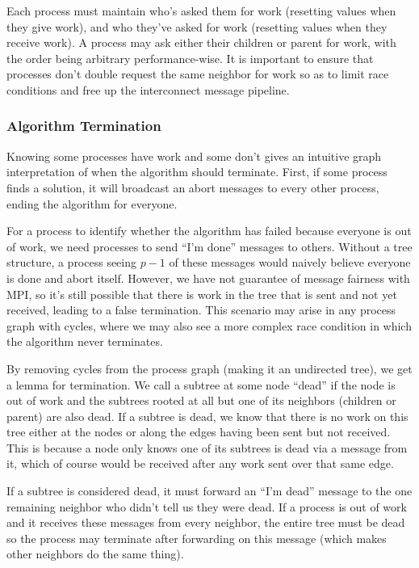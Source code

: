 \documentclass{article}
\begin{document}
Each process must maintain who's asked them for work (resetting values when they give work), and who they've asked for work (resetting values when they receive work). A process may ask either their children or parent for work, with the order being arbitrary performance-wise. It is important to ensure that processes don't double request the same neighbor for work so as to limit race conditions and free up the interconnect message pipeline.

\subsubsection{Algorithm Termination}

Knowing some processes have work and some don't gives an intuitive graph interpretation of when the algorithm should terminate. First, if some process finds a solution, it will broadcast an abort messages to every other process, ending the algorithm for everyone.

For a process to identify whether the algorithm has failed because everyone is out of work, we need processes to send ``I'm done'' messages to others. Without a tree structure, a process seeing $p - 1$ of these messages would naively believe everyone is done and abort itself. However, we have not guarantee of message fairness with MPI, so it's still possible that there is work in the tree that is sent and not yet received, leading to a false termination. This scenario may arise in any process graph with cycles, where we may also see a more complex race condition in which the algorithm never terminates.

By removing cycles from the process graph (making it an undirected tree), we get a lemma for termination. We call a subtree at some node ``dead'' if the node is out of work and the subtrees rooted at all but one of its neighbors (children or parent) are also dead. If a subtree is dead, we know that there is no work on this tree either at the nodes or along the edges having been sent but not received. This is because a node only knows one of its subtrees is dead via a message from it, which of course would be received after any work sent over that same edge. 

If a subtree is considered dead, it must forward an ``I'm dead'' message to the one remaining neighbor who didn't tell us they were dead. If a process is out of work and it receives these messages from every neighbor, the entire tree must be dead so the process may terminate after forwarding on this message (which makes other neighbors do the same thing).
\end{document}
